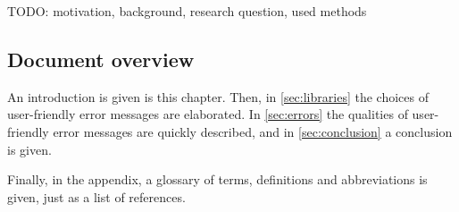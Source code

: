 TODO: motivation, background, research question, used methods\\

\subsection{Document overview}
An introduction is given is this chapter.
Then, in \autoref{sec:libraries} the choices of user-friendly error messages are elaborated.
In \autoref{sec:errors} the qualities of user-friendly error messages are quickly described, and in \autoref{sec:conclusion} a conclusion is given.

Finally, in the appendix, a glossary of terms, definitions and abbreviations is given, just as a list of references.

